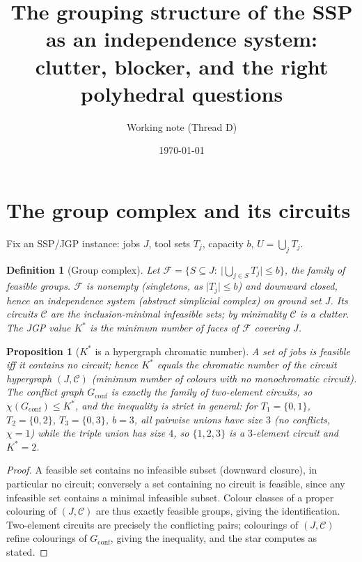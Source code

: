 \documentclass[11pt,a4paper]{article}
\title{The grouping structure of the SSP as an independence system:\\
clutter, blocker, and the right polyhedral questions}
\author{Working note (Thread D)}
\date{\today}
\newtheorem{proposition}{Proposition}
\newtheorem{definition}{Definition}
\newcommand{\Kstar}{K^{\ast}}
\begin{document}
\maketitle

\section{The group complex and its circuits}

Fix an SSP/JGP instance: jobs $J$, tool sets $T_j$, capacity $b$, $U=\bigcup_j
T_j$.

\begin{definition}[Group complex]
Let $\mathcal{F}=\{S\subseteq J:\ \lvert\bigcup_{j\in S}T_j\rvert\le b\}$, the
family of feasible groups. $\mathcal{F}$ is nonempty (singletons, as
$\lvert T_j\rvert\le b$) and downward closed, hence an \emph{independence
system} (abstract simplicial complex) on ground set $J$. Its \emph{circuits}
$\mathcal{C}$ are the inclusion-minimal infeasible sets; by minimality
$\mathcal{C}$ is a \emph{clutter}. The JGP value $\Kstar$ is the minimum number
of faces of $\mathcal{F}$ covering $J$.
\end{definition}

\begin{proposition}[$\Kstar$ is a hypergraph chromatic number]\label{prop:chrom}
A set of jobs is feasible iff it contains no circuit; hence $\Kstar$ equals the
chromatic number of the circuit hypergraph $(J,\mathcal{C})$ (minimum number of
colours with no monochromatic circuit). The conflict graph $G_{\mathrm{conf}}$
is exactly the family of \emph{two-element} circuits, so
$\chi(G_{\mathrm{conf}})\le\Kstar$, and the inequality is strict in general:
for $T_1=\{0,1\}$, $T_2=\{0,2\}$, $T_3=\{0,3\}$, $b=3$, all pairwise unions have
size $3$ (no conflicts, $\chi=1$) while the triple union has size $4$, so
$\{1,2,3\}$ is a $3$-element circuit and $\Kstar=2$.
\end{proposition}
\begin{proof}
A feasible set contains no infeasible subset (downward closure), in particular
no circuit; conversely a set containing no circuit is feasible, since any
infeasible set contains a minimal infeasible subset. Colour classes of a proper
colouring of $(J,\mathcal{C})$ are thus exactly feasible groups, giving the
identification. Two-element circuits are precisely the conflicting pairs;
colourings of $(J,\mathcal{C})$ refine colourings of $G_{\mathrm{conf}}$, giving
the inequality, and the star computes as stated.
\end{proof}
\end{document}
